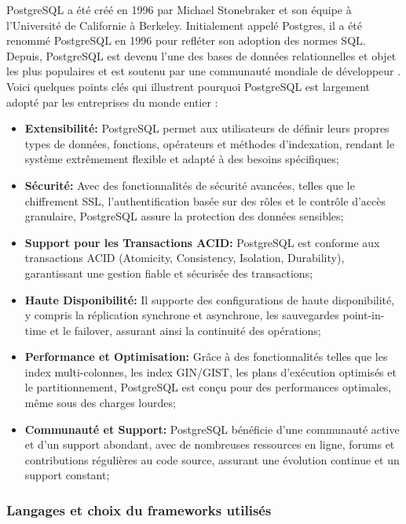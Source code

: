 \documentclass[12pt]{report}
\begin{document}
				PostgreSQL a été créé en 1996 par Michael Stonebraker et son équipe à l'Université de Californie à Berkeley. Initialement appelé Postgres, il a été renommé PostgreSQL en 1996 pour refléter son adoption des normes SQL. Depuis, PostgreSQL est devenu l'une des bases de données relationnelles et objet les plus populaires et est soutenu par une communauté mondiale de développeur \cite{PostgreSQLExperience}.\\

				Voici quelques points clés qui illustrent pourquoi PostgreSQL est largement adopté par les entreprises du monde entier :

				\begin{itemize}
					\item \textbf{Extensibilité:} PostgreSQL permet aux utilisateurs de définir leurs propres types de données, fonctions, opérateurs et méthodes d'indexation, rendant le système extrêmement flexible et adapté à des besoins spécifiques;
					\item \textbf{Sécurité:} Avec des fonctionnalités de sécurité avancées, telles que le chiffrement SSL, l'authentification basée sur des rôles et le contrôle d'accès granulaire, PostgreSQL assure la protection des données sensibles;
					\item \textbf{Support pour les Transactions ACID:} PostgreSQL est conforme aux transactions ACID (Atomicity, Consistency, Isolation, Durability), garantissant une gestion fiable et sécurisée des transactions;
					\item \textbf{Haute Disponibilité:} Il supporte des configurations de haute disponibilité, y compris la réplication synchrone et asynchrone, les sauvegardes point-in-time et le failover, assurant ainsi la continuité des opérations;
					\item \textbf{Performance et Optimisation:} Grâce à des fonctionnalités telles que les index multi-colonnes, les index GIN/GIST, les plans d'exécution optimisés et le partitionnement, PostgreSQL est conçu pour des performances optimales, même sous des charges lourdes;
					\item \textbf{Communauté et Support:} PostgreSQL bénéficie d'une communauté active et d'un support abondant, avec de nombreuses ressources en ligne, forums et contributions régulières au code source, assurant une évolution continue et un support constant;
				\end{itemize}

				\subsubsection{Langages et choix du frameworks utilisés}
\end{document}
